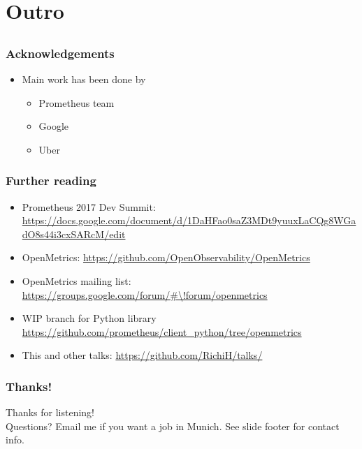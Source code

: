 \documentclass[t]{beamer}
\begin{document}
\section{Outro}

\subsection{}

\begin{frame}
	\frametitle{Acknowledgements}
	\vfill
	\begin{itemize}
		\item Main work has been done by
		\begin{itemize}
			\item Prometheus team
			\item Google
			\item Uber
		\end{itemize}
	\end{itemize}
	\vfill
\end{frame}

\begin{frame}
	\frametitle{Further reading}
	\vfill
	\begin{itemize}
		\item Prometheus 2017 Dev Summit: \url{https://docs.google.com/document/d/1DaHFao0saZ3MDt9yuuxLaCQg8WGadO8s44i3cxSARcM/edit}
		\item OpenMetrics: \url{https://github.com/OpenObservability/OpenMetrics}
		\item OpenMetrics mailing list: \url{https://groups.google.com/forum/\#\!forum/openmetrics}
		\item WIP branch for Python library \url{https://github.com/prometheus/client\_python/tree/openmetrics}
		\item This and other talks: \url{https://github.com/RichiH/talks/}
	\end{itemize}
	\vfill
\end{frame}

\begin{frame}
	\frametitle{Thanks!}
		\begin{center}
			\vfill
			Thanks for listening!\\
			\vfill
			Questions?
			\vfill
			Email me if you want a job in Munich.
			\vfill
			See slide footer for contact info.
			\vfill
		\end{center}
\end{frame}
\end{document}
